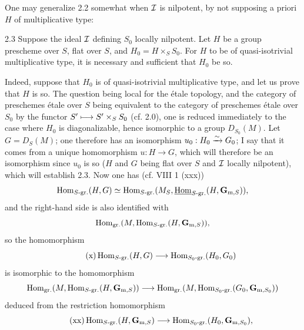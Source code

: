 One may generalize 2.2 somewhat when $\cal I$ is nilpotent, by not supposing a priori $H$ of multiplicative type:
\begin{corollary}{2.3}\label{X.2.3}
Suppose the ideal $\cal I$ defining $S_0$ locally nilpotent. Let $H$ be a group prescheme over $S$, flat over $S$, and $H_0=H\times_S S_0$. For $H$ to be of quasi-isotrivial multiplicative type, it is necessary and sufficient that $H_0$ be so.
\end{corollary}
Indeed, suppose that $H_0$ is of quasi-isotrivial multiplicative type, and let us prove that $H$ is so. The question being local for the étale topology, and the category of preschemes étale over $S$ being equivalent to the category of preschemes étale over $S_0$ by the functor $S'\mto S'\times_S S_0$ (cf. 2.0), one is reduced immediately to the case where $H_0$ is diagonalizable, hence isomorphic to a group $D_{S_0}(M)$. Let $G=D_S(M)$; one therefore has an isomorphism $u_0:H_0\isomto G_0$; I say that it comes from a unique homomorphism $u:H\to G$, which will therefore be an isomorphism since $u_0$ is so ($H$ and $G$ being flat over $S$ and $\cal I$ locally nilpotent), which will establish 2.3. Now one has (cf. VIII 1 (xxx))
\[
\Hom_{S\text{-}\mathrm{gr.}}(H,G)\simeq\Hom_{S\text{-}\mathrm{gr.}}(M_S,\uHom_{S\text{-}\mathrm{gr.}}(H,\mathbf{G}_{\mathrm{m},S})),
\]
and the right-hand side is also identified with
\[
\Hom_{\mathrm{gr.}}(M,\Hom_{S\text{-}\mathrm{gr.}}(H,\mathbf{G}_{\mathrm{m},S})),
\]
so the homomorphism
\begin{equation}\tag{x}
\Hom_{S\text{-}\mathrm{gr.}}(H,G)\to\Hom_{S_0\text{-}\mathrm{gr.}}(H_0,G_0)
\end{equation}
is isomorphic to the homomorphism
\[
\Hom_{\mathrm{gr.}}(M,\Hom_{S\text{-}\mathrm{gr.}}(H,\mathbf{G}_{\mathrm{m},S}))\to\Hom_{\mathrm{gr.}}(M,\Hom_{S_0\text{-}\mathrm{gr.}}(G_0,\mathbf{G}_{\mathrm{m},S_0}))
\]
deduced from the restriction homomorphism
\begin{equation}\tag{xx}
\Hom_{S\text{-}\mathrm{gr.}}(H,\mathbf{G}_{\mathrm{m},S})\to\Hom_{S_0\text{-}\mathrm{gr.}}(H_0,\mathbf{G}_{\mathrm{m},S_0}),
\end{equation}
